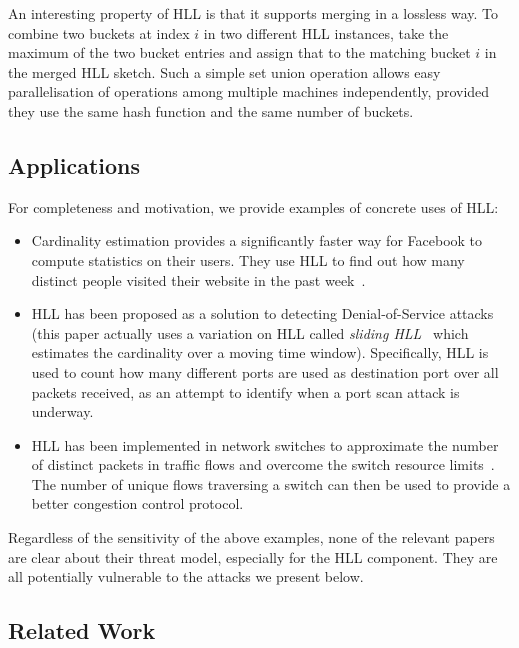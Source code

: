 \documentclass{IEEEtran}
\begin{document}
An interesting property of HLL is that it supports merging in a lossless way. To combine two buckets at index $i$ in two different HLL instances, take the maximum of the two bucket entries and assign that to the matching bucket $i$ in the merged HLL sketch. Such a simple set union operation allows easy parallelisation of operations among multiple machines independently, provided they use the same hash function and the same number of buckets.

\subsection{Applications}
For completeness and motivation, we provide examples of concrete uses of HLL:
\begin{itemize}
    \item Cardinality estimation provides a significantly faster way for Facebook to compute statistics on their users. They use HLL to find out how many distinct people visited their website in the past week~\cite{fbhll}.
    \item HLL has been proposed as a solution to detecting Denial-of-Service attacks~\cite{portscanhll} (this paper actually uses a variation on HLL called \emph{sliding HLL}~\cite{slidinghll} which estimates the cardinality over a moving time window). Specifically, HLL is used to count how many different ports are used as destination port over all packets received, as an attempt to identify when a port scan attack is underway.
        \item HLL has been implemented in network switches to approximate the number of distinct packets in traffic flows and overcome the switch resource limits~\cite{flexswitch}. The number of unique flows traversing a switch can then be used to provide a better congestion control protocol.
        \end{itemize}

Regardless of the sensitivity of the above examples, none of the relevant papers are clear about their threat model, especially for the HLL component.  They are all potentially vulnerable to the attacks we present below.

\subsection{Related Work}
\end{document}
